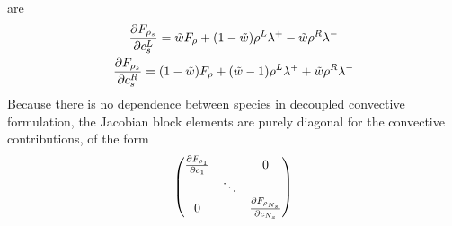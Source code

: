 are
\begin{gather}
  \frac{\partial F_{\rho_s}}{\partial c^L_s} = \tilde{w} F_\rho+(1-\tilde{w})\rho^L\lambda^+ - \tilde{w} \rho^R\lambda^- \\
  \frac{\partial F_{\rho_s}}{\partial c^R_s} = (1-\tilde{w}) F_\rho+(\tilde{w}-1)\rho^L\lambda^+ + \tilde{w}\rho^R\lambda^- 
  \label{dc-sp-linearizations}
\end{gather}
Because there is no dependence between species in decoupled convective
formulation, the Jacobian block elements are purely diagonal for the convective
contributions, of the form
\begin{equation} 
  \begin{pmatrix} 
    \frac{\partial F_{\rho_1}}{\partial c_1} & & 0 \\ 
    & \ddots & \\ 
    0 & & \frac{\partial F_{\rho_{N_s}}}{\partial c_{N_s}}
  \end{pmatrix}
  \label{dc-diag-Jacobian}
\end{equation}
